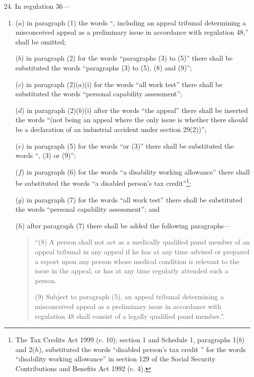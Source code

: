 \documentclass[12pt,a4paper]{article}
\begin{document}
24.  In regulation 36—
\begin{enumerate}\item[]
($a$) in paragraph (1) the words “, including an appeal tribunal determining a misconceived appeal as a preliminary issue in accordance with regulation 48,” shall be omitted;

($b$) in paragraph (2) for the words “paragraphs (3) to (5)” there shall be substituted the words “paragraphs (3) to (5), (8) and (9)”;

($c$) in paragraph (2)($a$)(i)  for the words “all work test” there shall be substituted the words “personal capability assessment”;

($d$) in paragraph (2)($b$)(i)  after the words “the appeal” there shall be inserted the words “(not being an appeal where the only issue is whether there should be a declaration of an industrial accident under section 29(2))”;

($e$) in paragraph (5) for the words “or (3)” there shall be substituted the words “, (3) or (9)”;

($f$) in paragraph (6) for the words “a disability working allowance” there shall be substituted the words “a disabled person’s tax credit”\footnote{\frenchspacing The Tax Credits Act 1999 (c. 10); section 1 and Schedule 1, paragraphs 1($b$) and 2($h$), substituted the words “disabled person’s tax credit ” for the words “disability working allowance” in section 129 of the Social Security Contributions and Benefits Act 1992 (c. 4).};

($g$) in paragraph (7) for the words “all work test” there shall be substituted the words “personal capability assessment”; and

($h$) after paragraph (7) there shall be added the following paragraphs—
\begin{quotation}
“(8) A person shall not act as a medically qualified panel member of an appeal tribunal in any appeal if he has at any time advised or prepared a report upon any person whose medical condition is relevant to the issue in the appeal, or has at any time regularly attended such a person.

(9) Subject to paragraph (5), an appeal tribunal determining a misconceived appeal as a preliminary issue in accordance with regulation 48 shall consist of a legally qualified panel member.”.
\end{quotation}
\end{enumerate}

\medskip
\end{document}
